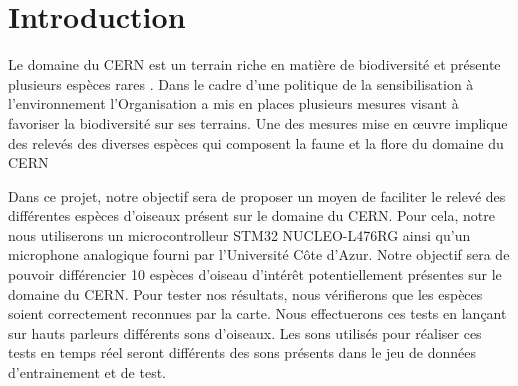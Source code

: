 \chapter{Introduction}

Le domaine du CERN est un terrain riche en matière de biodiversité et présente plusieurs espèces rares \cite{CernBiodiversity1}.
Dans le cadre d'une politique de la sensibilisation à l'environnement l'Organisation a mis en places plusieurs mesures
visant à favoriser la biodiversité sur ses terrains. 
Une des mesures mise en \oe{}uvre implique des relevés des diverses espèces 
qui composent la faune et la flore du domaine du CERN \cite{CernBiodiversity2}

Dans ce projet, notre objectif sera de proposer un moyen de faciliter le relevé des différentes espèces d'oiseaux
présent sur le domaine du CERN.
Pour cela, notre nous utiliserons un microcontrolleur STM32 NUCLEO-L476RG ainsi qu'un microphone analogique fourni 
par l'Université Côte d'Azur. 
Notre objectif sera de pouvoir différencier 10 espèces d'oiseau d'intérêt potentiellement présentes sur le domaine du CERN.
Pour tester nos résultats, nous vérifierons que les espèces soient correctement reconnues par la carte. Nous effectuerons ces tests
en lançant sur hauts parleurs différents sons d'oiseaux. 
Les sons utilisés pour réaliser ces tests en temps réel seront différents des sons présents dans le jeu de données d'entrainement et de test.
